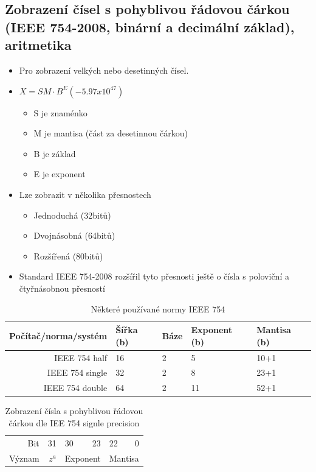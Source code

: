 \documentclass[10pt,a4paper]{article}
\begin{document}
\subsection{Zobrazení čísel s pohyblivou řádovou čárkou (IEEE 754-2008, binární a decimální základ), aritmetika}
\begin{itemize}
\item Pro zobrazení velkých nebo desetinných čísel.
\item $X = S M\cdot B^E (-5.97 x 10^47)$
\begin{itemize}
\item S je znaménko
\item M je mantisa (část za desetinnou čárkou)
\item B je základ
\item E je exponent
\end{itemize}
\item Lze zobrazit v několika přesnostech

\begin{itemize}
\item Jednoduchá (32bitů)
\item Dvojnásobná (64bitů)
\item Rozšířená (80bitů)
\end{itemize}
\item Standard IEEE 754-2008 rozšířil tyto přesnosti ještě o čísla s poloviční a čtyřnásobnou přesností
\end{itemize}

\begin{table}[ht]
\centering
\begin{tabular}{r|llll}
\hline
Počítač/norma/systém & Šířka (b) & Báze & Exponent (b) & Mantisa (b) \\
\hline
IEEE 754 half        & 16        & 2    & 5            & 10+1        \\
IEEE 754 single      & 32        & 2    & 8            & 23+1        \\
IEEE 754 double      & 64        & 2    & 11           & 52+1       \\
\hline
\end{tabular}
\caption{Některé používané normy IEEE 754}
\label{tab:iee754}
\end{table}

\begin{table}[ht]
\centering
\begin{tabular}{r|r|lr|lr}
\hline
Bit & 31 & 30  & 23 &22  & 0 \\
Význam & $z^a$ & \multicolumn{2}{c}{Exponent} & \multicolumn{2}{|c}{Mantisa}    \\

\hline
\end{tabular}
\caption{Zobrazení čísla s pohyblivou řádovou čárkou dle IEE 754 signle precision}
\label{tab:floatingPoint}
\end{table}
\end{document}
